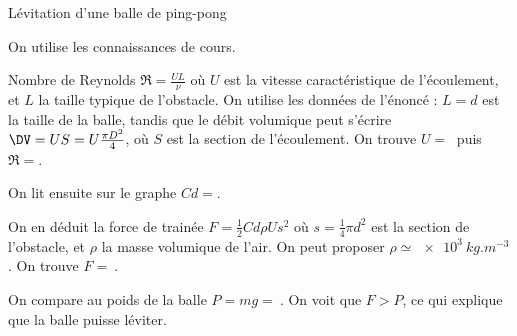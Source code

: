 \begin{exo}[PC][2][oral]{Lévitation d’une balle de ping-pong}
{\begin{liste}
  \item On utilise les connaissances de cours.
  \begin{liste}
    \item
  Nombre de Reynolds $\Re = \frac{UL}{\nu}$ où $U$ est la vitesse caractéristique de l'écoulement, et $L$ la taille typique de l'obstacle. On utilise les données de l'énoncé : $L=d$ est la taille de la balle, tandis que le débit volumique peut s'écrire $\DV = U S = U \frac{\pi D^2}{4}$, où $S$ est la section de l'écoulement. On trouve $U=\SI{}{}$ puis $\Re = $.
  \item On lit ensuite sur le graphe $Cd = $.
  \item On en déduit la force de trainée $F = \frac{1}{2} Cd \rho U s^2$ où $s=\frac{1}{4}\pi d^2$
  est la section de l'obstacle, et $\rho$ la masse volumique de l'air. On peut proposer $\rho \simeq \SI{e3}{kg.m^{-3}}$. On trouve $F = \SI{}{}$.
  \item On compare au poids de la balle $P=mg = \SI{}{}$. On voit que $F>P$, ce qui explique que la balle puisse léviter.
\end{liste}
\end{liste}
}
\end{exo}

